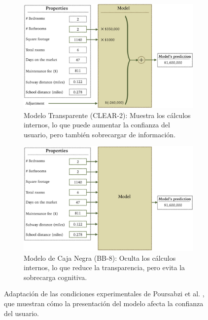 \begin{figure}[H]
    \centering
    \begin{subfigure}[b]{0.72\textwidth}
        \centering
        \includegraphics[width=\textwidth]{include/clear_model.PNG}
        \caption{Modelo Transparente (CLEAR-2): Muestra los cálculos internos, lo que puede aumentar la confianza del usuario, pero también sobrecargar de información.}
        \label{fig:clear_model}
    \end{subfigure}
    
    \vspace{0.5cm} %
    
    \begin{subfigure}[b]{0.72\textwidth}
        \centering
        \includegraphics[width=\textwidth]{include/black_model.PNG}
        \caption{Modelo de Caja Negra (BB-8): Oculta los cálculos internos, lo que reduce la transparencia, pero evita la sobrecarga cognitiva.}
        \label{fig:black_model}
    \end{subfigure}
    \caption{Adaptación de las condiciones experimentales de Poursabzi et al. \cite{Poursabzi-2021}, que muestran cómo la presentación del modelo afecta la confianza del usuario.}
    \label{fig:confianza_visualizaciones}
\end{figure}

